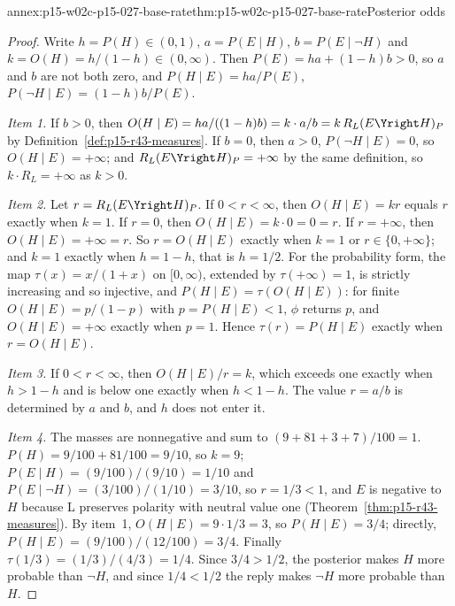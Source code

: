 \begin{annexitem}{annex:p15-w02c-p15-027-base-rate}{thm:p15-w02c-p15-027-base-rate}{Posterior odds}
\begin{proof}
Write \(h=P(H)\in(0,1)\), \(a=P(E\mid H)\), \(b=P(E\mid\neg H)\) and
\(k=O(H)=h/(1-h)\in(0,\infty)\). Then \(P(E)=ha+(1-h)b>0\), so \(a\) and
\(b\) are not both zero, and \(P(H\mid E)=ha/P(E)\),
\(P(\neg H\mid E)=(1-h)b/P(E)\).

\emph{Item 1.} If \(b>0\), then
\(O(H\mid E)=ha/((1-h)b)=k\cdot a/b=k\,R_L(E\Yright H)_P\) by
Definition~\ref{def:p15-r43-measures}. If \(b=0\), then \(a>0\),
\(P(\neg H\mid E)=0\), so \(O(H\mid E)=+\infty\); and
\(R_L(E\Yright H)_P=+\infty\) by the same definition, so
\(k\cdot R_L=+\infty\) as \(k>0\).

\emph{Item 2.} Let \(r=R_L(E\Yright H)_P\). If \(0<r<\infty\), then
\(O(H\mid E)=kr\) equals \(r\) exactly when \(k=1\). If \(r=0\), then
\(O(H\mid E)=k\cdot0=0=r\). If \(r=+\infty\), then
\(O(H\mid E)=+\infty=r\). So \(r=O(H\mid E)\) exactly when \(k=1\) or
\(r\in\{0,+\infty\}\); and \(k=1\) exactly when \(h=1-h\), that is
\(h=1/2\). For the probability form, the map \(\tau(x)=x/(1+x)\) on
\([0,\infty)\), extended by \(\tau(+\infty)=1\), is strictly increasing
and so injective, and \(P(H\mid E)=\tau(O(H\mid E))\): for finite
\(O(H\mid E)=p/(1-p)\) with \(p=P(H\mid E)<1\), \(\phi\) returns \(p\),
and \(O(H\mid E)=+\infty\) exactly when \(p=1\). Hence
\(\tau(r)=P(H\mid E)\) exactly when \(r=O(H\mid E)\).

\emph{Item 3.} If \(0<r<\infty\), then \(O(H\mid E)/r=k\), which
exceeds one exactly when \(h>1-h\) and is below one exactly when
\(h<1-h\). The value \(r=a/b\) is determined by \(a\) and \(b\), and
\(h\) does not enter it.

\emph{Item 4.} The masses are nonnegative and sum to
\((9+81+3+7)/100=1\). \(P(H)=9/100+81/100=9/10\), so \(k=9\);
\(P(E\mid H)=(9/100)/(9/10)=1/10\) and
\(P(E\mid\neg H)=(3/100)/(1/10)=3/10\), so \(r=1/3<1\), and \(E\) is
negative to \(H\) because L preserves polarity with neutral value one
(Theorem~\ref{thm:p15-r43-measures}). By item~1,
\(O(H\mid E)=9\cdot1/3=3\), so \(P(H\mid E)=3/4\); directly,
\(P(H\mid E)=(9/100)/(12/100)=3/4\). Finally
\(\tau(1/3)=(1/3)/(4/3)=1/4\). Since \(3/4>1/2\), the posterior makes
\(H\) more probable than \(\neg H\), and since \(1/4<1/2\) the reply
makes \(\neg H\) more probable than \(H\).
\end{proof}
\end{annexitem}

